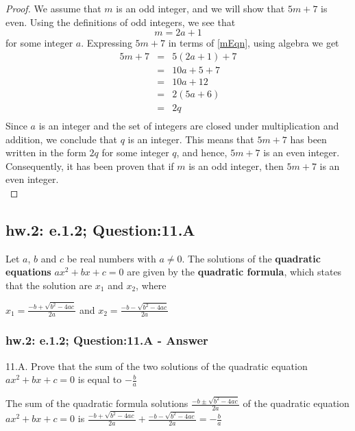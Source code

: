 \begin{proof}
We assume that $m$ is an odd integer, and we will show that $5m + 7$ is even. Using the definitions of odd integers, we see that
\begin{equation}
\label{mEqn}
m = 2a + 1 
\end{equation}
for some integer $a$. Expressing $5m + 7$ in terms of \ref{mEqn}, using algebra we get
\begin{eqnarray*}
5m + 7 & = & 5(2a + 1) + 7  \nonumber \\
& = & 10a + 5 + 7 \nonumber \\
& = & 10a + 12 \nonumber \\
& = & 2(5a + 6) \nonumber \\
& = & 2q \nonumber \\
\end{eqnarray*}
Since $a$ is an integer and the set of integers are closed under multiplication and addition, we conclude that $q$ is an integer. This means that $5m + 7$ has been written in the form $2q$ for some integer $q$, and hence, $5m + 7$ is an even integer. Consequently, it has been proven that if $m$ is an odd integer, then $5m + 7$ is an even integer. \\
\end{proof}


\newpage
\subsection{hw.2: e.1.2; Question:11.A}
Let $a$, $b$ and $c$ be real numbers with $a \neq 0$. The solutions of the {\bf quadratic equations} $ax^2 + bx + c = 0$ are given by the {\bf quadratic formula}, which states that the solution are $x_1$ and $x_2$, where \\

\begin{center}

$x_1 = \frac{-b + \sqrt{b^2 -4ac}}{2a}$ and $x_2 = \frac{-b - \sqrt{b^2 -4ac}}{2a}$
\end{center}

\subsubsection*{hw.2: e.1.2; Question:11.A - Answer}
11.A. Prove that the sum of the two solutions of the quadratic equation $ax^2 + bx + c = 0$ is equal to $ -\frac{b}{a}$ \\

\begin{tcolorbox}
\begin{theorem}
The sum of the quadratic formula solutions $\frac{-b \pm \sqrt{b^2 -4ac}}{2a}$ of the quadratic equation $ax^2 + bx + c = 0$ is $\frac{-b + \sqrt{b^2 -4ac}}{2a} + \frac{-b - \sqrt{b^2 -4ac}}{2a} = -\frac{b}{a}$
\end{theorem}
\end{tcolorbox}

